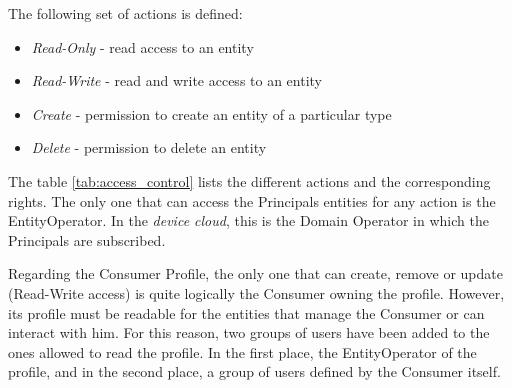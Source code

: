 The following set of actions is defined:
\begin{itemize}
	\item \textit{Read-Only} - read access to an entity
	\item \textit{Read-Write} - read and write access to an entity
	\item \textit{Create} - permission to create an entity of a particular type
	\item \textit{Delete} - permission to delete an entity
\end{itemize} 

\vspace{0.5em}
The table \ref{tab:access_control} lists the different actions and the corresponding rights. The only one that can access the Principals entities for any action is the EntityOperator. In the \emph{device cloud}, this is the Domain Operator in which the Principals are subscribed.

Regarding the Consumer Profile, the only one that can create, remove or update (Read-Write access) is quite logically the Consumer owning the profile. However, its profile must be readable for the entities that manage the Consumer or can interact with him. For this reason, two groups of users have been added to the ones allowed to read the profile. In the first place, the EntityOperator of the profile, and in the second place, a group of users defined by the Consumer itself.

